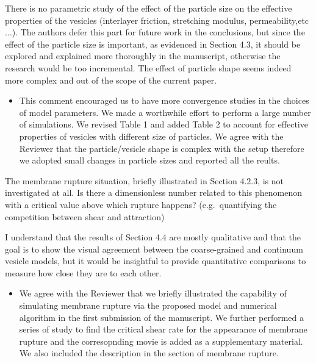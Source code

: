 \documentclass[11pt]{article}
\newcommand{\comment}[1]{{\color{blue} #1}}
\begin{document}
\noindent
\comment{There is no parametric study of the effect of the particle size
on the effective properties of the vesicles (interlayer friction,
stretching modulus, permeability,etc$\ldots$). The authors defer this
part for future work in the conclusions, but since the effect of the
particle size is important, as evidenced in Section 4.3, it should be
explored and explained more thoroughly in the manuscript, otherwise the
research would be too incremental. The effect of particle shape seems
indeed more complex and out of the scope of the current paper.}
\begin{itemize}
  \item This comment encouraged us to have more convergence studies in the choices of model parameters. We made a worthwhile effort to perform a large number of simulations. 
We revised Table 1 and added Table 2 to account for effective properties of vesicles with different size of particles. We agree with the Reviewer that the particle/vesicle shape is complex with the setup therefore we adopted small changes in particle sizes and reported all the reults.





\end{itemize}

\noindent
\comment{The membrane rupture situation, briefly illustrated in Section
4.2.3, is not investigated at all. Is there a dimensionless number
related to this phenomenon with a critical value above which rupture
happens? (e.g.~quantifying the competition between shear and
attraction)}

\noindent
\comment{I understand that the results of Section 4.4 are mostly
qualitative and that the goal is to show the visual agreement between
the coarse-grained and continuum vesicle models, but it would be
insightful to provide quantitative comparisons to measure how close they
are to each other.}
\begin{itemize}
  \item We agree with the Reviewer that we briefly illustrated the capability of simulating membrane rupture via the proposed model and numerical algorithm in the first submission of the manuscript. We further performed a series of study to find the critical shear rate for the appearance of membrane rupture and the corresopnding movie is added as a supplementary material. We also included the description in the section of membrane rupture.
\end{itemize}
\end{document}
